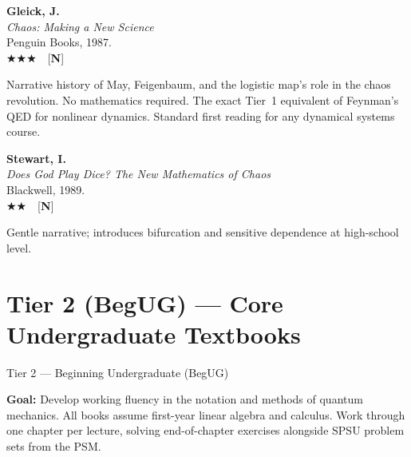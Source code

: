 \documentclass[11pt,a4paper]{article}
\newcommand{\essential}{$\bigstar\bigstar\bigstar$}
\newcommand{\recommended}{$\bigstar\bigstar$}
\newenvironment{bibentry}[1]{%
  \begin{tcolorbox}[entrybox=#1, top=4pt, bottom=4pt]%
}{%
  \end{tcolorbox}\smallskip%
}
\begin{document}
\begin{bibentry}{t1light}
\textbf{Gleick, J.}\\
\textit{Chaos: Making a New Science}\\
Penguin Books, 1987.\\[4pt]
\essential\ \ [\textbf{N}]\\[4pt]
\begin{tcolorbox}[annotbox]
Narrative history of May, Feigenbaum, and the logistic map's role in the chaos
revolution. No mathematics required. The exact Tier~1 equivalent of Feynman's QED
for nonlinear dynamics. Standard first reading for any dynamical systems course.
\end{tcolorbox}
\end{bibentry}

\begin{bibentry}{t1light}
\textbf{Stewart, I.}\\
\textit{Does God Play Dice? The New Mathematics of Chaos}\\
Blackwell, 1989.\\[4pt]
\recommended\ \ [\textbf{N}]\\[4pt]
\begin{tcolorbox}[annotbox]
Gentle narrative; introduces bifurcation and sensitive dependence at high-school level.
\end{tcolorbox}
\end{bibentry}

\newpage
\section{Tier 2 (BegUG) --- Core Undergraduate Textbooks}
\label{sec:t2}

\begin{tcolorbox}[tierheader=t2blue]
Tier 2 --- Beginning Undergraduate (BegUG)
\end{tcolorbox}

\medskip
\begin{tcolorbox}[keybox]
\textbf{Goal:} Develop working fluency in the notation and methods of quantum mechanics.
All books assume first-year linear algebra and calculus. Work through one chapter per
lecture, solving end-of-chapter exercises alongside SPSU problem sets from the PSM.
\end{tcolorbox}

\end{document}
